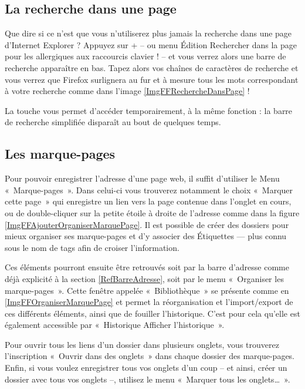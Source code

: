 \subsection{La recherche dans une page}
\label{RefRechercheFF}
Que dire si ce n'est que vous n'utiliserez plus jamais la recherche dans une page d'Internet Explorer ? Appuyez sur  +  -- ou menu Édition \FlecheDroite Rechercher dans la page pour les allergiques aux raccourcis clavier ! -- et vous verrez alors une barre de recherche apparaître en bas. Tapez alors vos chaînes de caractères de recherche et vous verrez que Firefox surlignera au fur et à mesure tous les mots correspondant à votre recherche comme dans l'image \ref{ImgFFRechercheDansPage} !
\begin{nota}
La touche \Touche{/} vous permet d'accéder temporairement, à la même fonction : la barre de recherche simplifiée disparaît au bout de quelques temps.
\end{nota}
\subsection{Les marque-pages}
\label{RefMarquePage}
Pour pouvoir enregistrer l'adresse d'une page web, il suffit d'utiliser le Menu «~Marque-pages~». Dans celui-ci vous trouverez notamment le choix «~Marquer cette page~» qui enregistre un lien vers la page contenue dans l'onglet en cours, ou de double-cliquer sur la petite étoile à droite de l'adresse comme dans la figure \ref{ImgFFAjouterOrganiserMarquePage}. Il est possible de créer des dossiers pour mieux organiser ses marque-pages et d'y associer des Étiquettes --- plus connu sous le nom de tags afin de croiser l'information.\par
{}
Ces éléments pourront ensuite être retrouvés soit par la barre d'adresse comme déjà explicité à la section \ref{RefBarreAdresse}, soit par le menu «~Organiser les marque-pages~». Cette fenêtre appelée «~Bibliothèque~» se présente comme en \ref{ImgFFOrganiserMarquePage} et permet la réorganisation et l'import/export de ces différents éléments, ainsi que de fouiller l'historique. C'est pour cela qu'elle est également accessible par «~Historique \FlecheDroite Afficher l'historique~».\par
{}
Pour ouvrir tous les liens d'un dossier dans plusieurs onglets, vous trouverez l'inscription «~Ouvrir dans des onglets~» dans chaque dossier des marque-pages.\\
Enfin, si vous voulez enregistrer tous vos onglets d'un coup -- et ainsi, créer un dossier avec tous vos onglets --, utilisez le menu «~Marquer tous les onglets\ldots{}~».
